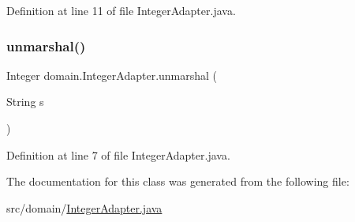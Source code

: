 Definition at line 11 of file Integer\+Adapter.\+java.


\begin{DoxyCode}{0}

\end{DoxyCode}
\mbox{\label{classdomain_1_1IntegerAdapter_ad2bfc5af140573682dd03906b9264b51}} 
\subsubsection{\texorpdfstring{unmarshal()}{unmarshal()}}
{\footnotesize\ttfamily Integer domain.\+Integer\+Adapter.\+unmarshal (\begin{DoxyParamCaption}\item[{String}]{s }\end{DoxyParamCaption})}



Definition at line 7 of file Integer\+Adapter.\+java.


\begin{DoxyCode}{0}

\end{DoxyCode}


The documentation for this class was generated from the following file\+:\begin{DoxyCompactItemize}
\item 
src/domain/\mbox{\hyperlink{IntegerAdapter_8java}{Integer\+Adapter.\+java}}\end{DoxyCompactItemize}
